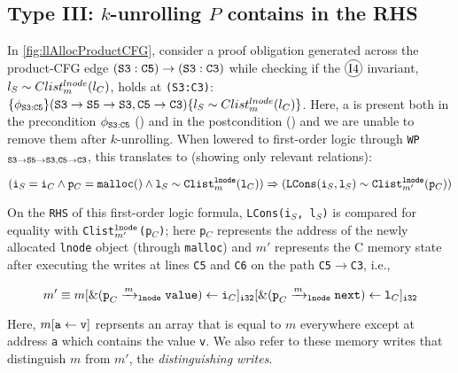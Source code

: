 \subsection[Handling Type III Proof Obligations]{Type III: $k$-unrolling $P$ contains \recursiveRelations{} in the RHS}
\label{sec:cat3}
In \cref{fig:llAllocProductCFG}, consider a proof obligation generated
across the product-CFG edge ${\tt (S3:C5) \rightarrow (S3:C3)}$
while checking if the {\small $\circled{I4}$} invariant, $l_{S}\sim{}Clist^{lnode}_{m}(l_{C})$,
holds at {\tt (S3:C3)}:
$\{\phi_{{\tt S3:C5}}\} ({\tt S3\rightarrow S5\rightarrow S3}, {\tt C5\rightarrow C3}) \{l_{S}\sim{}Clist^{lnode}_{m}(l_{C})\}$.
Here, a \recursiveRelation{} is present both in the precondition $\phi_{{\tt S3:C5}}$ ({\small {}})
and in the postcondition ({\small {}}) and we are unable to
remove them after $k$-unrolling.
When lowered to first-order logic
through {\tt WP$_{{\tt S3\rightarrow S5\rightarrow S3},{\tt C5\rightarrow C3}}$}, this translates to (showing only relevant
relations):
\vspace{-5px}
\begin{small}
\begin{equation}\label{eqn:ex1cat3}
({\tt i}_S={\tt i}_C \land {\tt p}_C={\tt malloc()} \land {\tt l}_S \sim{} {\tt Clist}_m^{{\tt lnode}}({\tt l}_C)) \Rightarrow ({\tt LCons}({\tt i}_S, {\tt l}_S) \sim{} {\tt Clist}_{m'}^{{\tt lnode}}({\tt p}_C))
\end{equation}
\end{small}
On the {\tt RHS} of this first-order logic formula, {\tt LCons(i$_S$, l$_S$)} is compared for
equality with {\tt Clist$_{m'}^{{\tt lnode}}$(p$_C$)}; here {\tt p$_C$}
represents the address of the newly allocated {\tt lnode} object (through {\tt malloc}) and $m'$
represents the C memory state after executing the writes at lines
{\tt C5} and {\tt C6} on the path {\tt C5$\rightarrow$C3},
i.e.,
\vspace{-5px}
\begin{small}
\begin{equation}\label{eqn:memstore}
m' \equiv m[{\tt \&(p}_C\xrightarrow[]{m}_{\mathrm{\tt lnode}}{\tt value}) \leftarrow {\tt i}_C]_{\tt i32}[{\tt \&(p}_C\xrightarrow[]{m}_{\mathrm{\tt lnode}}{\tt next}) \leftarrow {\tt l}_C]_{\tt i32}
\end{equation}
\end{small}
Here, $m[{\tt a}\leftarrow{\tt v}]$ reprsents an array that is
equal to $m$ everywhere except at address {\tt a} which contains the value {\tt v}.
We also refer to
these memory writes that distinguish $m$ from $m'$, the {\em distinguishing writes}.

